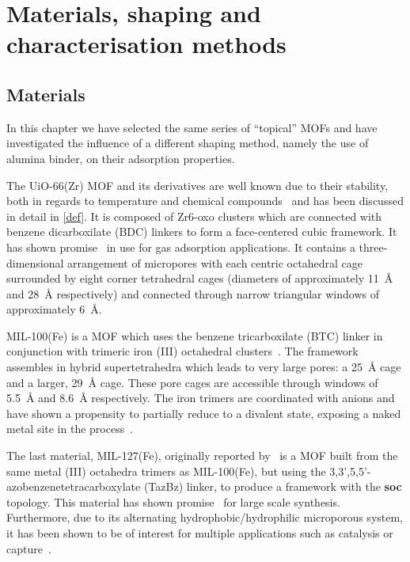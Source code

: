 
\section{Materials, shaping and characterisation methods}

\subsection{Materials}

In this chapter we have selected the same series of ``topical'' MOFs and
have investigated the influence of a different shaping method, namely
the use of alumina binder, on their adsorption properties.

The UiO-66(Zr) MOF and its derivatives are well known due to their
stability, both in regards to temperature and chemical
compounds~\cite{cavkaNewZirconiumInorganic2008} and has been
discussed in detail in \autoref{def}. It is composed of
Zr6-oxo clusters which are connected with benzene dicarboxilate
(BDC) linkers to form a face-centered cubic framework. It has
shown promise~\cite{wiersumEvaluationUiO66GasBased2011}
in use for gas adsorption applications. It contains a
three-dimensional arrangement of micropores with each centric
octahedral cage surrounded by eight corner tetrahedral cages
(diameters of approximately \SI{11}{\angstrom} and \SI{28}{\angstrom}
respectively) and connected through narrow triangular windows
of approximately \SI{6}{\angstrom}.

MIL-100(Fe) is a MOF which uses the benzene tricarboxilate (BTC) linker
in conjunction with trimeric iron (III) octahedral
clusters~\cite{horcajadaSynthesisCatalyticProperties2007,%
	YangWaterStableMetalOrganic2013}.
The framework assembles in hybrid supertetrahedra which leads to very
large pores: a \SI{25}{\angstrom} cage and a larger, \SI{29}{\angstrom}
cage. These pore cages are accessible through windows of
\SI{5.5}{\angstrom} and \SI{8.6}{\angstrom} respectively.
The iron trimers are coordinated with
anions and have shown a propensity to partially reduce to a divalent
 state, exposing a naked metal site in the
process~\cite{yoonControlledReducibilityMetalOrganic2010}.

The last material, MIL-127(Fe), originally reported
by~\citeauthor{liuAssemblyMetalOrganic2007} is a MOF built from the same
metal (III) octahedra trimers as MIL-100(Fe), but using the
3,3',5,5'-azobenzenetetracarboxylate (TazBz) linker, to produce a
framework with the \textbf{soc} topology. This material has shown
promise~\cite{chevreauSynthesisBiocompatibleHighly2016}
for large scale synthesis. Furthermore, due to its alternating
hydrophobic/hydrophilic microporous system, it has been shown to be
of interest for multiple applications such as catalysis or
 capture~\cite{chanutScreeningEffectWater2017}.

